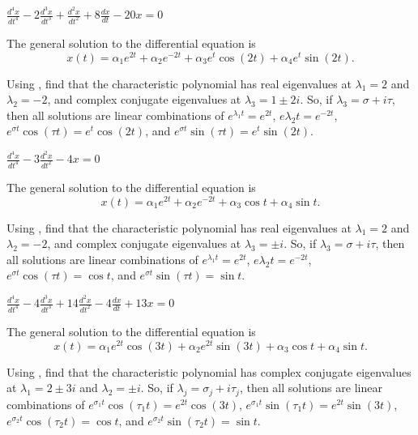 \documentclass{ximera}
\begin{document}
\begin{computerExercise} \label{c12.2.9}
$\frac{d^4x}{dt^4}-2\frac{d^3x}{dt^3}+\frac{d^2x}{dt^2}+8\frac{dx}{dt}-20x=0$

\begin{solution}
\ans The general solution to the differential equation is
\[
x(t) = \alpha_1e^{2t} + \alpha_2e^{-2t} + \alpha_3e^t\cos(2t) +
\alpha_4e^t\sin(2t).
\]

\soln Using \Matlab, find that the characteristic polynomial has real
eigenvalues at $\lambda_1 = 2$ and $\lambda_2 = -2$, and complex
conjugate eigenvalues at $\lambda_3 = 1 \pm 2i$.  So, if $\lambda_3 =
\sigma + i\tau$, then all solutions are linear combinations of
$e^{\lambda_1 t} = e^{2t}$, $e{\lambda_2 t} = e^{-2t}$,
$e^{\sigma t}\cos(\tau t) = e^t\cos(2t)$, and
$e^{\sigma t}\sin(\tau t) = e^t\sin(2t)$.

\end{solution}
\end{computerExercise}
\begin{computerExercise} \label{c12.2.10}
$\frac{d^4x}{dt^4}-3\frac{d^2x}{dt^2}-4x=0$

\begin{solution}
\ans The general solution to the differential equation is
\[
x(t) = \alpha_1e^{2t} + \alpha_2e^{-2t} + \alpha_3\cos t +
\alpha_4\sin t.
\]

\soln Using \Matlab, find that the characteristic polynomial has real
eigenvalues at $\lambda_1 = 2$ and $\lambda_2 = -2$, and complex
conjugate eigenvalues at $\lambda_3 = \pm i$.  So, if $\lambda_3 =
\sigma + i\tau$, then all solutions are linear combinations of
$e^{\lambda_1 t} = e^{2t}$, $e{\lambda_2 t} = e^{-2t}$,
$e^{\sigma t}\cos(\tau t) = \cos t$, and $e^{\sigma t}\sin(\tau t) = \sin t$.

\end{solution}
\end{computerExercise}
\begin{computerExercise} \label{c12.2.11}
$\frac{d^4x}{dt^4}-4\frac{d^3x}{dt^3}+14\frac{d^2x}{dt^2}-4\frac{dx}{dt}+13x=0$

\begin{solution}
\ans The general solution to the differential equation is
\[
x(t) = \alpha_1e^{2t}\cos(3t) + \alpha_2e^{2t}\sin(3t) +
\alpha_3\cos t + \alpha_4\sin t.
\]

\soln Using \Matlab, find that the characteristic polynomial has complex
conjugate eigenvalues at $\lambda_1 = 2 \pm 3i$ and $\lambda_2 = \pm i$.
So, if $\lambda_j = \sigma_j + i\tau_j$, then all solutions are linear
combinations of $e^{\sigma_1 t}\cos(\tau_1 t) = e^{2t}\cos(3t)$,
$e^{\sigma_1 t}\sin(\tau_1 t) = e^{2t}\sin(3t)$,
$e^{\sigma_2 t}\cos(\tau_2 t) = \cos t$, and
$e^{\sigma_2 t}\sin(\tau_2 t) = \sin t$.





\end{solution}
\end{computerExercise}
\end{document}
